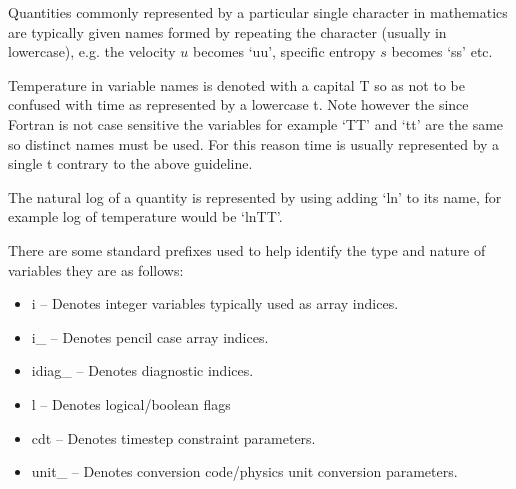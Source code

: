 \documentclass[\mydriver,12pt,twoside,notitlepage,a4paper]{article}
\begin{document}
Quantities commonly represented by a particular single character
in mathematics are typically given names formed by repeating the
character (usually in lowercase), e.g. the velocity $u$ becomes `uu', 
specific entropy $s$ becomes `ss' etc. 

Temperature in variable names is denoted with a capital T so as not to
be confused with time as represented by a lowercase t.  Note however the
since Fortran is not case sensitive the variables for example `TT' and
`tt' are the same so distinct names must be used. For this reason time is
usually represented by a single t contrary to the above guideline.

The natural log of a quantity is represented by using adding `ln' to its 
name, for example log of temperature would be `lnTT'.

There are some standard prefixes used to help identify the type and nature
of variables they are as follows:
\begin{itemize}
\item i -- Denotes integer variables typically used as array indices.
\item i_ -- Denotes pencil case array indices.
\item idiag_ -- Denotes diagnostic indices.
\item l -- Denotes logical/boolean flags
\item cdt -- Denotes timestep constraint parameters.
\item unit_ -- Denotes conversion code/physics unit conversion parameters.
\end{itemize}
\end{document}
